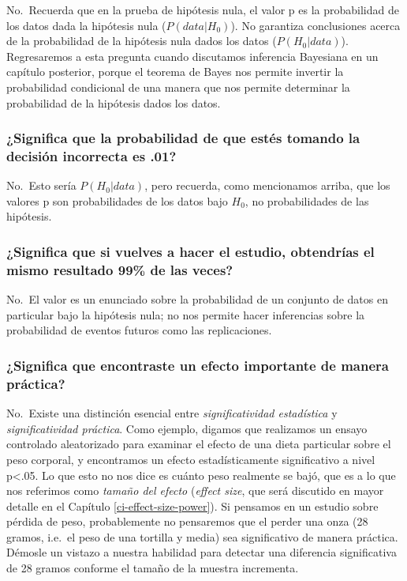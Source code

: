 \documentclass[
  12pt,
]{book}
\begin{document}
No.~Recuerda que en la prueba de hipótesis nula, el valor p es la probabilidad de los datos dada la hipótesis nula (\(P(data|H_0)\)). No garantiza conclusiones acerca de la probabilidad de la hipótesis nula dados los datos (\(P(H_0|data)\)). Regresaremos a esta pregunta cuando discutamos inferencia Bayesiana en un capítulo posterior, porque el teorema de Bayes nos permite invertir la probabilidad condicional de una manera que nos permite determinar la probabilidad de la hipótesis dados los datos.

\hypertarget{significa-que-la-probabilidad-de-que-estuxe9s-tomando-la-decisiuxf3n-incorrecta-es-.01}{%
\subsubsection{¿Significa que la probabilidad de que estés tomando la decisión incorrecta es .01?}\label{significa-que-la-probabilidad-de-que-estuxe9s-tomando-la-decisiuxf3n-incorrecta-es-.01}}

No.~Esto sería \(P(H_0|data)\), pero recuerda, como mencionamos arriba, que los valores p son probabilidades de los datos bajo \(H_0\), no probabilidades de las hipótesis.

\hypertarget{significa-que-si-vuelves-a-hacer-el-estudio-obtendruxedas-el-mismo-resultado-99-de-las-veces}{%
\subsubsection{¿Significa que si vuelves a hacer el estudio, obtendrías el mismo resultado 99\% de las veces?}\label{significa-que-si-vuelves-a-hacer-el-estudio-obtendruxedas-el-mismo-resultado-99-de-las-veces}}

No.~El valor es un enunciado sobre la probabilidad de un conjunto de datos en particular bajo la hipótesis nula; no nos permite hacer inferencias sobre la probabilidad de eventos futuros como las replicaciones.

\hypertarget{significa-que-encontraste-un-efecto-importante-de-manera-pruxe1ctica}{%
\subsubsection{¿Significa que encontraste un efecto importante de manera práctica?}\label{significa-que-encontraste-un-efecto-importante-de-manera-pruxe1ctica}}

No.~Existe una distinción esencial entre \emph{significatividad estadística} y \emph{significatividad práctica}. Como ejemplo, digamos que realizamos un ensayo controlado aleatorizado para examinar el efecto de una dieta particular sobre el peso corporal, y encontramos un efecto estadísticamente significativo a nivel p\textless.05. Lo que esto no nos dice es cuánto peso realmente se bajó, que es a lo que nos referimos como \emph{tamaño del efecto} (\emph{effect size}, que será discutido en mayor detalle en el Capítulo \ref{ci-effect-size-power}). Si pensamos en un estudio sobre pérdida de peso, probablemente no pensaremos que el perder una onza (28 gramos, i.e.~el peso de una tortilla y media) sea significativo de manera práctica. Démosle un vistazo a nuestra habilidad para detectar una diferencia significativa de 28 gramos conforme el tamaño de la muestra incrementa.
\end{document}
